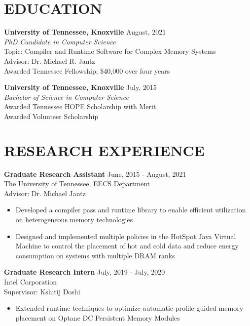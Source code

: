 \documentclass[margin,11pt]{res} %
\newlength\tindent
\begin{document}
\begin{resume}

\section{EDUCATION}
  {\textbf{University of Tennessee, Knoxville}} \hfill August, 2021 \\
    \textit{PhD Candidate in Computer Science} \\
    \hspace*{\tindent} Topic: Compiler and Runtime Software for Complex Memory Systems \\
    \hspace*{\tindent} Advisor: Dr. Michael R. Jantz \\
    \hspace*{\tindent} Awarded Tennessee Fellowship; \$40,000 over four years

  {\textbf{University of Tennessee, Knoxville}} \hfill July, 2015 \\
    \textit{Bachelor of Science in Computer Science} \\
    \hspace*{\tindent} Awarded Tennessee HOPE Scholarship with Merit \\
    \hspace*{\tindent} Awarded Volunteer Scholarship

\section{RESEARCH EXPERIENCE}

  {\textbf{Graduate Research Assistant}} \hfill June, 2015 - August, 2021 \\
   The University of Tennessee, EECS Department \\
   Advisor: Dr. Michael Jantz
    \begin{itemize} \itemsep -2pt
      \item Developed a compiler pass and runtime library to enable
            efficient utilization on heterogeneous memory technologies
      \item Designed and implemented multiple policies in the HotSpot Java
            Virtual Machine to control the placement of hot and cold data and
            reduce energy consumption on systems with multiple DRAM ranks
    \end{itemize}
    
  {\textbf{Graduate Research Intern}} \hfill July, 2019 - July, 2020 \\
   Intel Corporation \\
   Supervisor: Kshitij Doshi
    \begin{itemize} \itemsep -2pt
      \item Extended runtime techniques to optimize automatic profile-guided 
            memory placement on Optane DC Persistent Memory Modules
    \end{itemize}


\end{resume}
\end{document}
